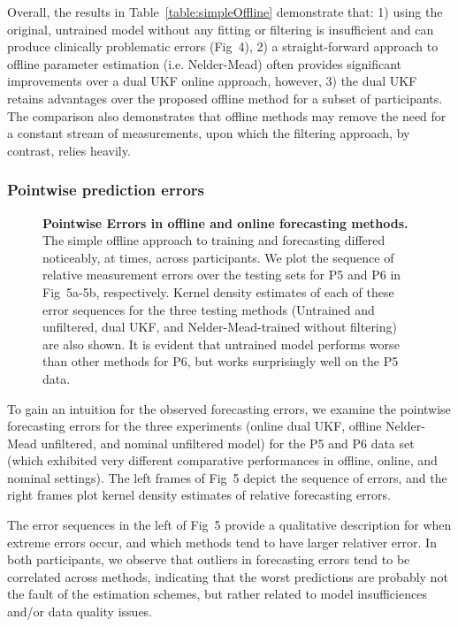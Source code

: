 \documentclass[10pt,letterpaper]{article}
\begin{document}
Overall, the results in Table~\ref{table:simpleOffline} demonstrate that: 1) using the original, untrained model without any fitting or filtering is insufficient and can produce clinically problematic errors (Fig~4), 2) a straight-forward approach to offline parameter estimation (i.e. Nelder-Mead) often provides significant improvements over a dual UKF online approach, however, 3) the dual UKF retains advantages over the proposed offline method for a subset of participants. The comparison also demonstrates that offline methods may remove the need for a constant stream of measurements, upon which the filtering approach, by contrast, relies heavily.
	
\subsubsection{Pointwise prediction errors}

\begin{figure}[!h]
  \centering
  \par
  \caption{{\bf Pointwise Errors in offline and online forecasting methods.}
  The simple offline approach to training and forecasting differed noticeably, at times, across participants. We plot the sequence of relative measurement errors over the testing sets for P5 and P6 in Fig~5a-5b, respectively. Kernel density estimates of each of these error sequences for the three testing methods (Untrained and unfiltered, dual UKF, and Nelder-Mead-trained without filtering) are also shown. It is evident that untrained model performs worse than other methods for P6, but works surprisingly well on the P5 data.}
  \label{fig:pointwiseError}
\end{figure}

To gain an intuition for the observed forecasting errors, we examine the pointwise forecasting errors for the three experiments (online dual UKF, offline Nelder-Mead unfiltered, and nominal unfiltered model) for the P5 and P6 data set (which exhibited very different comparative performances in offline, online, and nominal settings). The left frames of Fig~5 depict the sequence of errors, and the right frames plot kernel density estimates of relative forecasting errors. 

The error sequences in the left of Fig~5 provide a qualitative description for when extreme errors occur, and which methods tend to have larger relativer error. In both participants, we observe that outliers in forecasting errors tend to be correlated across methods, indicating that the worst predictions are probably not the fault of the estimation schemes, but rather related to model insufficiences and/or data quality issues.
\end{document}
